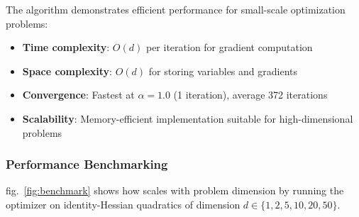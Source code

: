 \documentclass[
]{article}
\providecommand{\tightlist}{%
  \setlength{\itemsep}{0pt}\setlength{\parskip}{0pt}}
\begin{document}
The algorithm demonstrates efficient performance for small-scale
optimization problems:

\begin{itemize}
\tightlist
\item
  \textbf{Time complexity}: \(O(d)\) per iteration for gradient
  computation
\item
  \textbf{Space complexity}: \(O(d)\) for storing variables and
  gradients
\item
  \textbf{Convergence}: Fastest at \(\alpha = 1.0\) (1 iteration),
  average 372 iterations
\item
  \textbf{Scalability}: Memory-efficient implementation suitable for
  high-dimensional problems
\end{itemize}

\subsubsection{Performance
Benchmarking}\label{performance-benchmarking-1}

fig.~\ref{fig:benchmark} shows how  scales
with problem dimension by running the optimizer on identity-Hessian
quadratics of dimension \(d \in \{1, 2, 5, 10, 20, 50\}\).
\end{document}
